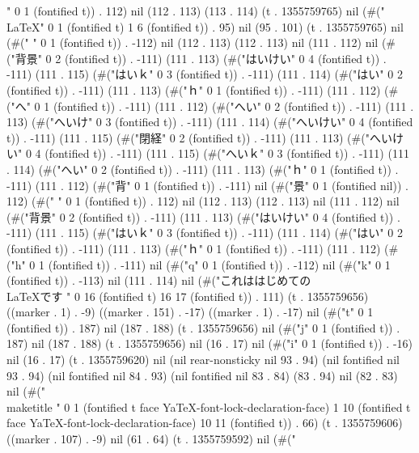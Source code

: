 " 0 1 (fontified t)) . 112) nil (112 . 113) (113 . 114) (t . 1355759765) nil (#("\\LaTeX" 0 1 (fontified t) 1 6 (fontified t)) . 95) nil (95 . 101) (t . 1355759765) nil (#("
" 0 1 (fontified t)) . -112) nil (112 . 113) (112 . 113) nil (111 . 112) nil (#("背景" 0 2 (fontified t)) . -111) (111 . 113) (#("はいけい" 0 4 (fontified t)) . -111) (111 . 115) (#("はいｋ" 0 3 (fontified t)) . -111) (111 . 114) (#("はい" 0 2 (fontified t)) . -111) (111 . 113) (#("ｈ" 0 1 (fontified t)) . -111) (111 . 112) (#("へ" 0 1 (fontified t)) . -111) (111 . 112) (#("へい" 0 2 (fontified t)) . -111) (111 . 113) (#("へいけ" 0 3 (fontified t)) . -111) (111 . 114) (#("へいけい" 0 4 (fontified t)) . -111) (111 . 115) (#("閉経" 0 2 (fontified t)) . -111) (111 . 113) (#("へいけい" 0 4 (fontified t)) . -111) (111 . 115) (#("へいｋ" 0 3 (fontified t)) . -111) (111 . 114) (#("へい" 0 2 (fontified t)) . -111) (111 . 113) (#("ｈ" 0 1 (fontified t)) . -111) (111 . 112) (#("背" 0 1 (fontified t)) . -111) nil (#("景" 0 1 (fontified nil)) . 112) (#("
" 0 1 (fontified t)) . 112) nil (112 . 113) (112 . 113) nil (111 . 112) nil (#("背景" 0 2 (fontified t)) . -111) (111 . 113) (#("はいけい" 0 4 (fontified t)) . -111) (111 . 115) (#("はいｋ" 0 3 (fontified t)) . -111) (111 . 114) (#("はい" 0 2 (fontified t)) . -111) (111 . 113) (#("ｈ" 0 1 (fontified t)) . -111) (111 . 112) (#("h" 0 1 (fontified t)) . -111) nil (#("q" 0 1 (fontified t)) . -112) nil (#("k" 0 1 (fontified t)) . -113) nil (111 . 114) nil (#("これははじめての\\LaTeXです
" 0 16 (fontified t) 16 17 (fontified t)) . 111) (t . 1355759656) ((marker . 1) . -9) ((marker . 151) . -17) ((marker . 1) . -17) nil (#("t" 0 1 (fontified t)) . 187) nil (187 . 188) (t . 1355759656) nil (#("j" 0 1 (fontified t)) . 187) nil (187 . 188) (t . 1355759656) nil (16 . 17) nil (#("i" 0 1 (fontified t)) . -16) nil (16 . 17) (t . 1355759620) nil (nil rear-nonsticky nil 93 . 94) (nil fontified nil 93 . 94) (nil fontified nil 84 . 93) (nil fontified nil 83 . 84) (83 . 94) nil (82 . 83) nil (#("\\maketitle
" 0 1 (fontified t face YaTeX-font-lock-declaration-face) 1 10 (fontified t face YaTeX-font-lock-declaration-face) 10 11 (fontified t)) . 66) (t . 1355759606) ((marker . 107) . -9) nil (61 . 64) (t . 1355759592) nil (#(" 
